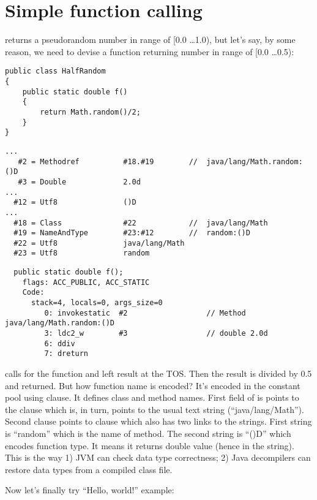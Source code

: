 \section{Simple function calling}

 returns a pseudorandom number in range of [0.0 \dots 1.0), but let's say,
by some reason, we need to devise a function returning number in range of [0.0 \dots 0.5):

\begin{lstlisting}
public class HalfRandom
{ 
	public static double f()
	{
		return Math.random()/2;
	}
}
\end{lstlisting}

\begin{lstlisting}[caption=Constant pool]
...
   #2 = Methodref          #18.#19        //  java/lang/Math.random:()D
   #3 = Double             2.0d
...
  #12 = Utf8               ()D
...
  #18 = Class              #22            //  java/lang/Math
  #19 = NameAndType        #23:#12        //  random:()D
  #22 = Utf8               java/lang/Math
  #23 = Utf8               random
\end{lstlisting}

\begin{lstlisting}
  public static double f();
    flags: ACC_PUBLIC, ACC_STATIC
    Code:
      stack=4, locals=0, args_size=0
         0: invokestatic  #2                  // Method java/lang/Math.random:()D
         3: ldc2_w        #3                  // double 2.0d
         6: ddiv          
         7: dreturn       
\end{lstlisting}

 calls for the  function and left result at the \ac{TOS}.
Then the result is divided by 0.5 and returned.
But how function name is encoded?
It's encoded in the constant pool using  clause. 
It defines class and method names.
First field of  is points to the  clause which is, in turn, points to
the usual text string (``java/lang/Math'').
Second  clause points to  clause which also has two links 
to the strings.
First string is ``random'' which is the name of method.
The second string is ``()D'' which encodes function type. It means it returns double value
(hence  in the string).
This is the way 1) JVM can check data type correctness; 2) Java decompilers can restore data types
from a compiled class file.

Now let's finally try ``Hello, world!'' example:

